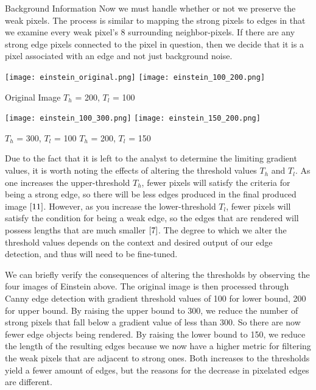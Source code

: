 \documentclass[a4paper,12pt]{article}
\begin{document}
\begin{section}{Background Information}
Now we must handle whether or not we preserve the weak pixels.
The process is similar to mapping the strong pixels to edges in that we examine every weak pixel's 8 surrounding neighbor-pixels. 
If there are any strong edge pixels connected to the pixel in question, then we decide that it is a pixel associated with an edge and not just background noise.\\

\begin{center}
\texttt{[image: einstein\_original.png]}
\texttt{[image: einstein\_100\_200.png]}

Original Image \hspace{25mm} $T_h$ = 200, $T_l$ = 100
\end{center}
\begin{center}
\texttt{[image: einstein\_100\_300.png]}
\texttt{[image: einstein\_150\_200.png]}

$T_h$ = 300, $T_l$ = 100 \hspace{20mm} $T_h$ = 200, $T_l$ = 150
\end{center}

Due to the fact that it is left to the analyst to determine the limiting gradient values, it is worth noting the effects of altering the threshold values $T_h$ and $T_l$.
As one increases the upper-threshold $T_h$, fewer pixels will satisfy the criteria for being a strong edge, so there will be less edges produced in the final produced image $\cite{11}$.
However, as you increase the lower-threshold $T_l$, fewer pixels will satisfy the condition for being a weak edge, so the edges that are rendered will possess lengths that are much smaller $\cite{7}$.
The degree to which we alter the threshold values depends on the context and desired output of our edge detection, and thus will need to be fine-tuned. 

We can briefly verify the consequences of altering the thresholds by observing the four images of Einstein above. The original image is then processed through Canny edge detection with gradient threshold values of 100 for lower bound, 200 for upper bound. By raising the upper bound to 300, we reduce the number of strong pixels that fall below a gradient value of less than 300. So there are now fewer edge objects being rendered. By raising the lower bound to 150, we reduce the length of the resulting edges because we now have a higher metric for filtering the weak pixels that are adjacent to strong ones. Both increases to the thresholds yield a fewer amount of edges, but the reasons for the decrease in pixelated edges are different.


\end{section}
\end{document}
